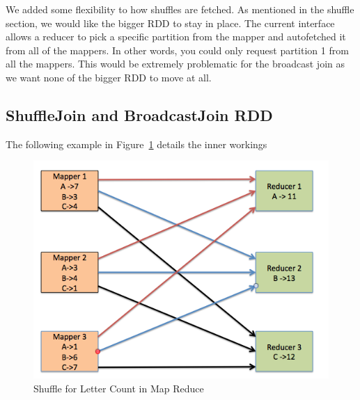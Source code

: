 We added some flexibility to how shuffles are fetched. As mentioned in the shuffle section,
we would like the bigger RDD to stay in place. The current interface allows a reducer to pick a specific partition
from the mapper and autofetched it from all of the mappers. In other words, you could only request partition 1 from
all the mappers. This would be extremely problematic for the broadcast join as we want none of the bigger RDD to move
at all.   

\subsection{ShuffleJoin and BroadcastJoin RDD}

The following example in Figure~\ref{fig:shuffle_basic} details the inner workings 
\begin{figure}[h]
\begin{center}
\includegraphics[scale=1.0]{./img/shuffle_basic.png}
\caption{Shuffle for Letter Count in Map Reduce}
\label{fig:shuffle_basic}
\end{center}
\end{figure}


